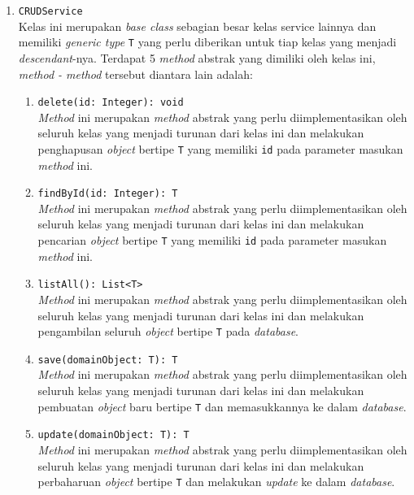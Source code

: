 \begin{enumerate}
	\item \texttt{CRUDService}\\
	Kelas ini merupakan \textit{base class} sebagian besar kelas service lainnya dan memiliki \textit{generic type} \texttt{T} yang perlu diberikan untuk tiap kelas yang menjadi \textit{descendant}-nya. Terdapat 5 \textit{method} abstrak yang dimiliki oleh kelas ini, \textit{method - method} tersebut diantara lain adalah:
	\begin{enumerate}
		\item \texttt{delete(id: Integer): void}\\
		\textit{Method} ini merupakan \textit{method} abstrak yang perlu diimplementasikan oleh seluruh kelas yang menjadi turunan dari kelas ini dan melakukan penghapusan \textit{object} bertipe \texttt{T} yang memiliki \texttt{id} pada parameter masukan \textit{method} ini.
		
		\item \texttt{findById(id: Integer): T}\\
		\textit{Method} ini merupakan \textit{method} abstrak yang perlu diimplementasikan oleh seluruh kelas yang menjadi turunan dari kelas ini dan melakukan pencarian \textit{object} bertipe \texttt{T} yang memiliki \texttt{id} pada parameter masukan \textit{method} ini.

		\item \texttt{listAll(): List<T>}\\
		\textit{Method} ini merupakan \textit{method} abstrak yang perlu diimplementasikan oleh seluruh kelas yang menjadi turunan dari kelas ini dan melakukan pengambilan seluruh \textit{object} bertipe \texttt{T} pada \textit{database}.

		\item \texttt{save(domainObject: T): T}\\
		\textit{Method} ini merupakan \textit{method} abstrak yang perlu diimplementasikan oleh seluruh kelas yang menjadi turunan dari kelas ini dan melakukan pembuatan \textit{object} baru bertipe \texttt{T} dan memasukkannya ke dalam \textit{database}.

		\item \texttt{update(domainObject: T): T}\\
		\textit{Method} ini merupakan \textit{method} abstrak yang perlu diimplementasikan oleh seluruh kelas yang menjadi turunan dari kelas ini dan melakukan perbaharuan \textit{object} bertipe \texttt{T} dan melakukan \textit{update} ke dalam \textit{database}.
		

\end{enumerate}
\end{enumerate}
